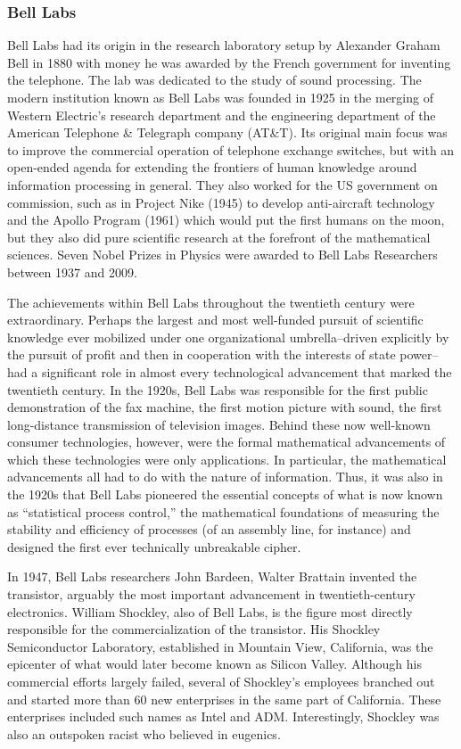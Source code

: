 \documentclass[12pt,book]{article}
\begin{document}
\subsubsection{Bell Labs}\label{bell-labs}

Bell Labs had its origin in the research laboratory setup by Alexander
Graham Bell in 1880 with money he was awarded by the French government
for inventing the telephone. The lab was dedicated to the study of sound
processing. The modern institution known as Bell Labs was founded in
1925 in the merging of Western Electric's research department and the
engineering department of the American Telephone \& Telegraph company
(AT\&T). Its original main focus was to improve the commercial operation
of telephone exchange switches, but with an open-ended agenda for
extending the frontiers of human knowledge around information processing
in general. They also worked for the US government on commission, such
as in Project Nike (1945) to develop anti-aircraft technology and the
Apollo Program (1961) which would put the first humans on the moon, but
they also did pure scientific research at the forefront of the
mathematical sciences. Seven Nobel Prizes in Physics were awarded to
Bell Labs Researchers between 1937 and 2009.

The achievements within Bell Labs throughout the twentieth century were
extraordinary. Perhaps the largest and most well-funded pursuit of
scientific knowledge ever mobilized under one organizational
umbrella--driven explicitly by the pursuit of profit and then in
cooperation with the interests of state power--had a significant role in
almost every technological advancement that marked the twentieth
century. In the 1920s, Bell Labs was responsible for the first public
demonstration of the fax machine, the first motion picture with sound,
the first long-distance transmission of television images. Behind these
now well-known consumer technologies, however, were the formal
mathematical advancements of which these technologies were only
applications. In particular, the mathematical advancements all had to do
with the nature of information. Thus, it was also in the 1920s that Bell
Labs pioneered the essential concepts of what is now known as
``statistical process control,'' the mathematical foundations of
measuring the stability and efficiency of processes (of an assembly
line, for instance) and designed the first ever technically unbreakable
cipher.

In 1947, Bell Labs researchers John Bardeen, Walter Brattain invented
the transistor, arguably the most important advancement in
twentieth-century electronics. William Shockley, also of Bell Labs, is
the figure most directly responsible for the commercialization of the
transistor. His Shockley Semiconductor Laboratory, established in
Mountain View, California, was the epicenter of what would later become
known as Silicon Valley. Although his commercial efforts largely failed,
several of Shockley's employees branched out and started more than 60
new enterprises in the same part of California. These enterprises
included such names as Intel and ADM. Interestingly, Shockley was also
an outspoken racist who believed in eugenics.
\end{document}
